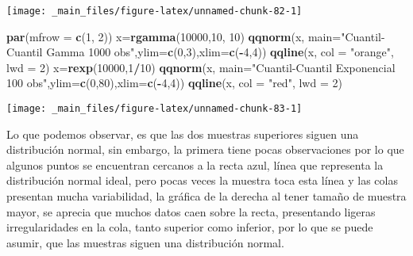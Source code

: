 \documentclass[a4paper,oneside,openany]{book}
\newenvironment{Shaded}{\begin{snugshade}}{\end{snugshade}}
\newcommand{\KeywordTok}[1]{\textcolor[rgb]{0.13,0.29,0.53}{\textbf{#1}}}
\newcommand{\DataTypeTok}[1]{\textcolor[rgb]{0.13,0.29,0.53}{#1}}
\newcommand{\DecValTok}[1]{\textcolor[rgb]{0.00,0.00,0.81}{#1}}
\newcommand{\StringTok}[1]{\textcolor[rgb]{0.31,0.60,0.02}{#1}}
\newcommand{\OperatorTok}[1]{\textcolor[rgb]{0.81,0.36,0.00}{\textbf{#1}}}
\newcommand{\NormalTok}[1]{#1}
\begin{document}
\begin{center}\texttt{[image: \_main\_files/figure-latex/unnamed-chunk-82-1]} \end{center}

\begin{Shaded}
\begin{Highlighting}[]
\KeywordTok{par}\NormalTok{(}\DataTypeTok{mfrow =} \KeywordTok{c}\NormalTok{(}\DecValTok{1}\NormalTok{, }\DecValTok{2}\NormalTok{))}
\NormalTok{x=}\KeywordTok{rgamma}\NormalTok{(}\DecValTok{10000}\NormalTok{,}\DecValTok{10}\NormalTok{, }\DecValTok{10}\NormalTok{)}
\KeywordTok{qqnorm}\NormalTok{(x, }\DataTypeTok{main=}\StringTok{"Cuantil-Cuantil Gamma 1000 obs"}\NormalTok{,}\DataTypeTok{ylim=}\KeywordTok{c}\NormalTok{(}\DecValTok{0}\NormalTok{,}\DecValTok{3}\NormalTok{),}\DataTypeTok{xlim=}\KeywordTok{c}\NormalTok{(}\OperatorTok{-}\DecValTok{4}\NormalTok{,}\DecValTok{4}\NormalTok{)) }
\KeywordTok{qqline}\NormalTok{(x, }\DataTypeTok{col =} \StringTok{"orange"}\NormalTok{, }\DataTypeTok{lwd =} \DecValTok{2}\NormalTok{)}
\NormalTok{x=}\KeywordTok{rexp}\NormalTok{(}\DecValTok{10000}\NormalTok{,}\DecValTok{1}\OperatorTok{/}\DecValTok{10}\NormalTok{) }
\KeywordTok{qqnorm}\NormalTok{(x, }\DataTypeTok{main=}\StringTok{"Cuantil-Cuantil Exponencial 100 obs"}\NormalTok{,}\DataTypeTok{ylim=}\KeywordTok{c}\NormalTok{(}\DecValTok{0}\NormalTok{,}\DecValTok{80}\NormalTok{),}\DataTypeTok{xlim=}\KeywordTok{c}\NormalTok{(}\OperatorTok{-}\DecValTok{4}\NormalTok{,}\DecValTok{4}\NormalTok{)) }
\KeywordTok{qqline}\NormalTok{(x, }\DataTypeTok{col =} \StringTok{"red"}\NormalTok{, }\DataTypeTok{lwd =} \DecValTok{2}\NormalTok{)}
\end{Highlighting}
\end{Shaded}

\begin{center}\texttt{[image: \_main\_files/figure-latex/unnamed-chunk-83-1]} \end{center}

Lo que podemos observar, es que las dos muestras superiores siguen una
distribución normal, sin embargo, la primera tiene pocas observaciones
por lo que algunos puntos se encuentran cercanos a la recta azul, línea
que representa la distribución normal ideal, pero pocas veces la muestra
toca esta línea y las colas presentan mucha variabilidad, la gráfica de
la derecha al tener tamaño de muestra mayor, se aprecia que muchos datos
caen sobre la recta, presentando ligeras irregularidades en la cola,
tanto superior como inferior, por lo que se puede asumir, que las
muestras siguen una distribución normal.
\end{document}
